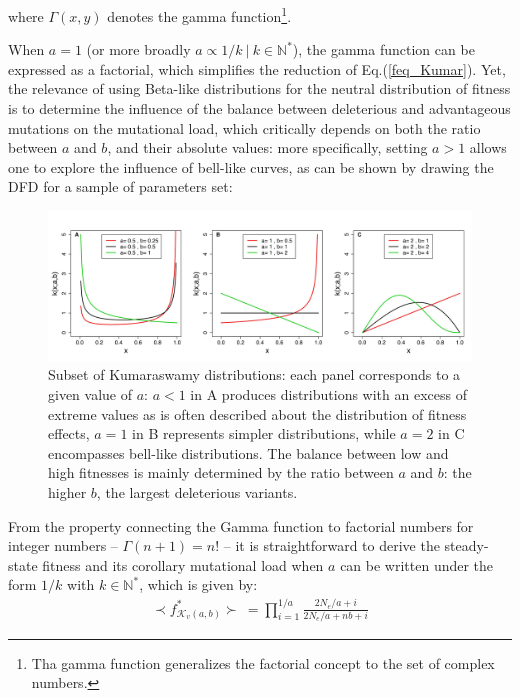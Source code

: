 where $\Gamma(x,y)$ denotes the gamma function\footnote{Tha gamma function generalizes the factorial concept to the set of complex numbers.}.

When $a=1$ (or more broadly $ a \propto 1/k ~ |~k \in \mathbb{N^*}$), the gamma function can be expressed as a factorial, which simplifies the reduction of Eq.(\ref{feq_Kumar}). Yet, the relevance of using Beta-like distributions for the neutral distribution of fitness is to determine the influence of the balance between deleterious and advantageous mutations on the mutational load, which critically depends on both the ratio between $a$ and $b$, and their absolute values: more specifically, setting $a>1$ allows one to explore the influence of bell-like curves, as can be shown by drawing the DFD for a sample of parameters set:
\vspace{-0.25cm}
\begin{figure}[h!]
    \centering
    \includegraphics[scale=0.5,trim=0cm 0.25cm 0cm 0.25cm,clip]{pics/Epistasis/Kumar_dist.jpeg}
    \caption{Subset of Kumaraswamy distributions: each panel corresponds to a given value of $a$: $a<1$ in A produces distributions with an excess of extreme values as is often described about the distribution of fitness effects, $a=1$ in B represents simpler distributions, while $a=2$ in C encompasses bell-like distributions. The balance between low and high fitnesses is mainly determined by the ratio between $a$ and $b$: the higher $b$, the largest deleterious variants.}
    \label{fig:Kumar_dist}
\end{figure}

From the property connecting the Gamma function to factorial numbers for integer numbers -- $\Gamma(n+1)=n!$ -- it is straightforward to derive the steady-state fitness and its corollary mutational load when $a$ can be written under the form $1/k$ with $k \in \mathbb{N}^*$, which is given by:
\begin{align}
    \prec f^*_{\mathcal{K}_v(a,b)}\succ~=\prod _{i=1}^{1/a} \frac{2N_e/a+i}{2N_e/a+nb+i}
\end{align}

